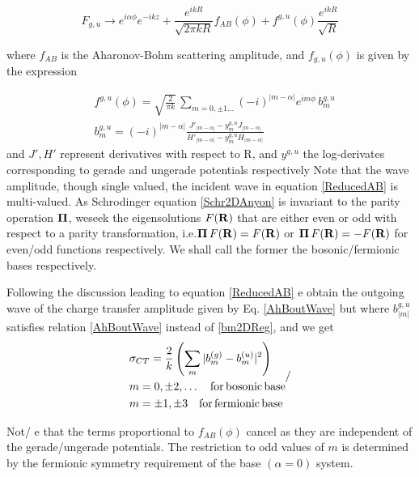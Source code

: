 \begin{equation}\label{ReducedAB}
F_{g,u} \rightarrow e^{i \alpha \phi} e^{-i k z} + \frac{e^{i k R}}{\sqrt{2 \pi k R} } f_{AB}(\phi) + f^{g,u}(\phi) \frac{e^{i k R}}{\sqrt{ R} }
\end{equation}

where $f_{AB} $ is the Aharonov-Bohm scattering amplitude, and $ f_{g,u}(\phi) $ is given by the expression

\begin{equation}\label{AhBoutWave}
  \begin{split}
& f^{g,u}(\phi) =\sqrt{\frac{2}{\pi k}} \, \sum_{m=0, \pm 1 \dots} {(-i)}^{|m-\alpha |}  e^{i m \phi} \, b^{g,u}_{m} \\
& b^{g,u}_{m}= {(-i)}^{| m -\alpha | } \frac{J'_{| m-\alpha | }- y^{g,u}_{m} J_{|m -\alpha|} }{ H'_{| m-\alpha |} - y^{g,u}_{m} H_{|m-\alpha|}} 
\end{split}
\end{equation}
and $J', H'$ represent derivatives with respect to R, and $ y^{g,u}$ the log-derivates corresponding to gerade and ungerade potentials respectively Note that the wave amplitude, though single valued, the incident wave in equation \eqref{ReducedAB} is multi-valued.
As Schrodinger equation \eqref{Schr2DAnyon} is invariant to the parity operation $ {\bf \Pi}$, weseek the eigensolutions $F({\bf R})$ that are either even or odd with respect to a parity transformation, i.e.${\bf \Pi}\, F({\bf R}) = F({\bf R}) $ or
${\bf \Pi} \, F({\bf R}) = -F({\bf R}) $ for even/odd functions respectively. We shall call the former the bosonic/fermionic bases respectively.

Following the discussion leading to equation \eqref{ReducedAB} e obtain the outgoing wave
of the charge transfer amplitude given by Eq. \eqref{AhBoutWave} but where
 $ b_{|m|}^{g,u} $ satisfies relation \eqref{AhBoutWave}  instead of \eqref{bm2DReg}, and we get
\begin{equation}
\begin{split}
&\sigma_{CT} = \frac{2}{k} \left (\sum_{m} | b^{(g)}_{m} - b^{(u)}_{m} |^2 \right ) \\
& m=0, \pm 2, \dots \quad {\rm for \, bosonic \, base} \\
& m=\pm 1, \pm 3 \quad {\rm for \, fermionic \, base}
\end{split}
/\end{equation}

Not/
e that the terms proportional to $ f_{AB}(\phi) $ cancel as they are independent of the gerade/ungerade potentials. The restriction to odd values of $ m$ is determined by the fermionic symmetry requirement of the base $(\alpha=0)$ system.  


